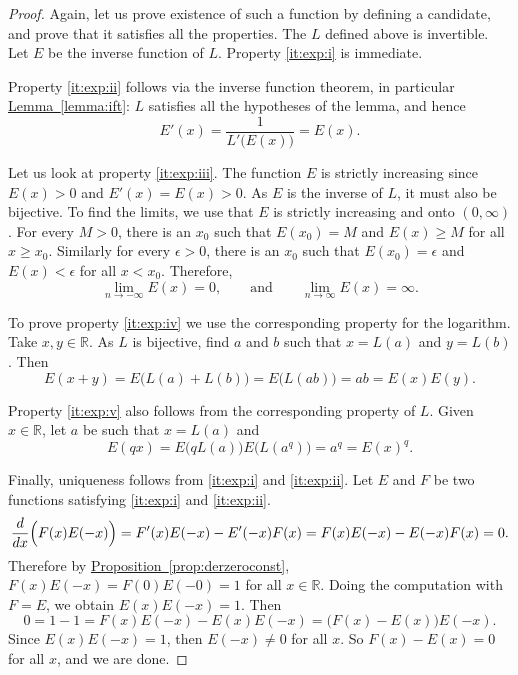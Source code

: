 \documentclass[12pt]{book}
\newcommand{\R}{{\mathbb{R}}}
\theoremstyle{plain}
\theoremstyle{remark}
\theoremstyle{definition}
\theoremstyle{exercise}
\theoremstyle{example}
\newcommand{\propref}[1]{\hyperref[#1]{Proposition~\ref*{#1}}}
\newcommand{\lemmaref}[1]{\hyperref[#1]{Lemma~\ref*{#1}}}
\begin{document}
\begin{proof}
Again, let us prove existence of such a function by defining a candidate,
and prove that it satisfies all the properties.
The $L$ defined above is invertible.  Let $E$ be the
inverse function of $L$.  Property \ref{it:exp:i} is immediate.

Property \ref{it:exp:ii} follows
via the inverse function theorem, in particular
\lemmaref{lemma:ift}:  $L$ satisfies
all the hypotheses of the lemma, and hence
\begin{equation*}
E'(x) = \frac{1}{L'\bigl(E(x)\bigr)} = E(x) .
\end{equation*}

Let us look at property \ref{it:exp:iii}.
The function $E$ is strictly increasing since $E(x) > 0$ and
$E'(x) = E(x) > 0$.  As $E$ is the inverse of $L$, it must also
be bijective.  
To find the limits, we use that 
$E$ is strictly increasing and onto $(0,\infty)$.
For every $M > 0$, there is an $x_0$ such that
$E(x_0) = M$ and $E(x) \geq M$ for all $x \geq x_0$.
Similarly for every $\epsilon > 0$, there is
an $x_0$ such that $E(x_0) = \epsilon$ and
$E(x) < \epsilon$ for all $x < x_0$.
Therefore,
\begin{equation*}
\lim_{n\to -\infty} E(x) = 0 , \qquad \text{and} \qquad
\lim_{n\to \infty} E(x) = \infty .
\end{equation*}

To prove property \ref{it:exp:iv} we use the corresponding
property for the logarithm.
Take $x, y \in \R$.
As $L$ is bijective, find $a$ and $b$ such that $x = L(a)$ and $y = L(b)$.  Then
\begin{equation*}
E(x+y) =
E\bigl(L(a)+L(b)\bigr) = 
E\bigl(L(ab)\bigr) = ab = E(x)E(y)  .
\end{equation*}

Property \ref{it:exp:v} also follows from the corresponding property of $L$.
Given $x \in \R$, let $a$ be such that $x = L(a)$ and
\begin{equation*}
E(qx) = E\bigl(qL(a)\bigr)
E\bigl(L(a^q)\bigr) = a^q = {E(x)}^q .
\end{equation*}

Finally, uniqueness follows from
\ref{it:exp:i} and
\ref{it:exp:ii}.
Let $E$ and $F$
be two functions satisfying
\ref{it:exp:i} and \ref{it:exp:ii}.  
\begin{equation*}
\frac{d}{dx} \Bigl( F(x)E(-x) \Bigr)
=
F'(x)E(-x) - E'(-x)F(x)
=
F(x)E(-x) - E(-x)F(x) = 0 .
\end{equation*}
Therefore by \propref{prop:derzeroconst},
$F(x)E(-x) = F(0)E(-0) = 1$ for all $x \in \R$.
Doing the computation with $F = E$,
we obtain $E(x)E(-x) = 1$.  Then
\begin{equation*}
0 = 1-1 = F(x)E(-x) - E(x)E(-x) = \bigl(F(x)-E(x)\bigr) E(-x) .
\end{equation*}
Since $E(x)E(-x) = 1$, then $E(-x) \not= 0$ for
all $x$.  So
$F(x)-E(x) = 0$ for all $x$, and we are done.
\end{proof}
\end{document}

